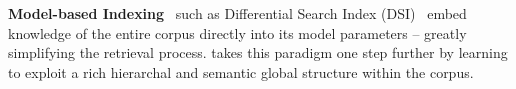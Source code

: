 \textbf{Model-based Indexing}~\cite{Metzler2021RethinkingSM} such as Differential Search Index (DSI)~\cite{Tay2022TransformerMA} embed knowledge of the entire corpus directly into its model parameters -- greatly simplifying the retrieval process. {\sys} takes this paradigm one step further by learning to exploit a rich hierarchal and semantic global structure within the corpus.